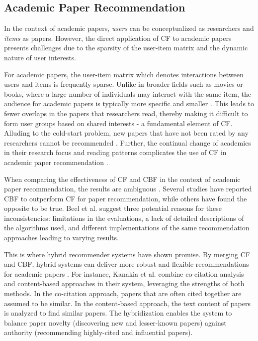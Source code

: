\subsection{Academic Paper Recommendation}

In the context of academic papers, \emph{users} can be conceptualized as researchers and \emph{items} as papers. However, the direct application of \ac{CF} to academic papers presents challenges due to the sparsity of the user-item matrix and the dynamic nature of user interests.

For academic papers, the user-item matrix which denotes interactions between users and items is frequently sparse. Unlike in broader fields such as movies or books, where a large number of individuals may interact with the same item, the audience for academic papers is typically more specific and smaller \cite{AgarwalResearchPaper2005}. This leads to fewer overlaps in the papers that researchers read, thereby making it difficult to form user groups based on shared interests - a fundamental element of \ac{CF}.
Alluding to the cold-start problem, new papers that have not been rated by any researchers cannot be recommended \cite{BreitingerAcademicLiterature2023}. Further, the continual change of academics in their research focus and reading patterns complicates the use of \ac{CF} in academic paper recommendation \cite{RoySystematicReview2022}.

When comparing the effectiveness of \ac{CF} and \ac{CBF} in the context of academic paper recommendation, the results are ambiguous \cite{BeelResearchpaperRecommender2016}.
Several studies have reported \ac{CBF} to outperform \ac{CF} for paper recommendation, while others have found the opposite to be true. Beel et al. \cite{BeelResearchpaperRecommender2016} suggest three potential reasons for these inconsistencies: limitations in the evaluations, a lack of detailed descriptions of the algorithms used, and different implementations of the same recommendation approaches leading to varying results.

This is where hybrid recommender systems have shown promise. By merging \ac{CF} and \ac{CBF}, hybrid systems can deliver more robust and flexible recommendations for academic papers \cite{BaiScientificPaper2020,SugiyamaExploitingPotential2013}. For instance, Kanakia et al. \cite{KanakiaScalableHybrid2019} combine co-citation analysis and content-based approaches in their system, leveraging the strengths of both methods. In the co-citation approach, papers that are often cited together are assumed to be similar. In the content-based approach, the text content of papers is analyzed to find similar papers. The hybridization enables the system to balance paper novelty (discovering new and lesser-known papers) against authority (recommending highly-cited and influential papers).

